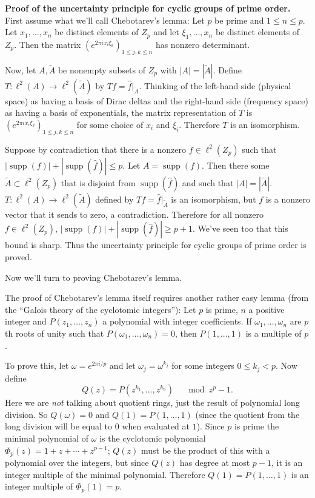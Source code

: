 \documentclass{slides}
\DeclareMathOperator{\supp}{supp}
\begin{document}
\begin{slide}
\textbf{Proof of the uncertainty principle for cyclic groups
of prime order.} First assume what we'll call Chebotarev's lemma:
Let $p$ be prime and $1 \leq n \leq p$. Let $x_1,\ldots,x_n$ be distinct
elements of $Z_p$ and let $\xi_1,\ldots,x_n$ be distinct elements of
$Z_p$. Then the matrix $(e^{2\pi i x_i \xi_k})_{1 \leq j,k\leq n}$
has nonzero determinant.

Now, let $A,\tilde{A}$ be nonempty subsets of $Z_p$ with $|A|=|\tilde{A}|$.
Define $T:\ell^2(A) \to \ell^2(\tilde{A})$ by
$Tf=\hat{f}|_{\tilde{A}}$. Thinking of the left-hand side (physical space)
as having a basis of Dirac deltas and the right-hand side (frequency space)
as having a basis of exponentials, the matrix representation of $T$
is $(e^{2\pi i x_i \xi_k})_{1 \leq j,k\leq n}$ for some choice of
$x_i$ and $\xi_i$. Therefore $T$ is an isomorphism.
\end{slide}
 
\begin{slide}
Suppose by contradiction that there is a nonzero $f \in \ell^2(Z_p)$
such that $|\supp(f)|+|\supp(\hat{f})| \leq p$. Let $A=\supp(f)$.
Then there some $\tilde{A} \subset \ell^2(Z_p)$ that is disjoint from
$\supp(\hat{f})$ and such that $|A|=|\tilde{A}|$. $T:\ell^2(A) \to
\ell^2(\tilde{A})$ defined by $Tf=\hat{f}|_{\tilde{A}}$ is an isomorphism,
but $f$ is a nonzero vector that it sends to zero, a contradiction. Therefore
for all nonzero $f \in \ell^2(Z_p)$, $|\supp(f)|+|\supp(\hat{f})| \geq p+1$.
We've seen too that this bound is sharp.
Thus the uncertainty principle for cyclic groups of prime order is proved.

Now we'll turn to proving Chebotarev's lemma.
\end{slide}

\begin{slide}
The proof of Chebotarev's lemma itself requires another rather
easy lemma (from the ``Galois theory of the cyclotomic integers''): Let $p$ is prime, $n$ a positive integer and $P(z_1,\ldots,z_n)$
a polynomial with integer coefficients. If $\omega_1,\ldots,\omega_n$ are
$p$th roots of unity such that $P(\omega_1,\ldots,\omega_n)=0$, then
$P(1,\ldots,1)$ is a multiple of $p$.

To prove this, let $\omega=e^{2\pi i/p}$ and let $\omega_j=\omega^{k_j}$
for some integers $0 \leq k_j<p$. Now define
\[
Q(z)=P(z^{k_1},\ldots,z^{k_n}) \quad \mod z^p-1.
\]
Here we are \emph{not} talking about quotient rings, just the result of polynomial long division.
So $Q(\omega)=0$ and $Q(1)=P(1,\ldots,1)$ (since the quotient from the long division will be equal to $0$ when evaluated at $1$). Since
$p$ is prime the minimal polynomial of $\omega$ is the cyclotomic polynomial
$\Phi_p(z)=1+z+\cdots+z^{p-1}$; $Q(z)$ must be the product of this with a polynomial
over the integers, but since $Q(z)$ has degree at most $p-1$, it is an integer
multiple of the minimal polynomial.
Therefore $Q(1)=P(1,\ldots,1)$ is an integer multiple of $\Phi_p(1)=p$.
\end{slide}
\end{document}
